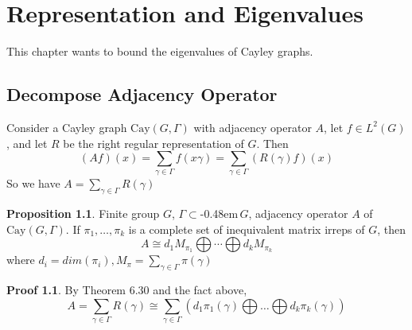 \documentclass{book}
\newcommand{\syin}{$\subset$\kern-0.48em\raisebox{.20ex}{\tiny S}$\,$}
\newcommand{\Cay}[1]{\textrm{Cay}( #1 )}
\theoremstyle{definition}
\newtheorem{proposition}[lemma]{Proposition}
\theoremstyle{remarkstyle}
\newtheorem*{myproof}{Proof}%
\begin{document}
\setcounter{chapter}{6}
\chapter{Representation and Eigenvalues}
This chapter wants to bound the eigenvalues of Cayley graphs. \newline



\section{Decompose Adjacency Operator}
Consider a Cayley graph $\Cay{G,\Gamma}$ with adjacency operator $A$, let $f\in L^2(G)$, and let $R$ be the right regular representation of $G$. Then
$$
(Af)(x) = \sum_{\gamma\in\Gamma}f(x\gamma) = \sum_{\gamma\in \Gamma}(R(\gamma)f)(x)
$$
So we have $A=\sum_{\gamma\in\Gamma}R(\gamma) $ \newline

\begin{proposition}
    Finite group $G$, $\Gamma$\syin$G$, adjacency operator $A$ of $\Cay{G,\Gamma}$. If $\pi_1,\dots,\pi_k$ is a complete set of inequivalent matrix irreps of $G$, then 
    $$
    A \cong d_1M_{\pi_1} \bigoplus \cdots \bigoplus d_kM_{\pi_k}
    $$
    where $d_i=dim(\pi_i), M_{\pi}=\sum_{\gamma\in\Gamma}\pi(\gamma) $
\end{proposition}
\begin{myproof}
    By Theorem 6.30 and the fact above, 
    $$
    A = \sum_{\gamma\in\Gamma}R(\gamma) \cong \sum_{\gamma\in\Gamma}(d_1\pi_1(\gamma)\bigoplus\dots\bigoplus d_k\pi_k(\gamma))
    $$
    \newline
\end{myproof}
\end{document}
